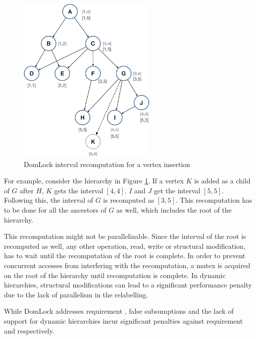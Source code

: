 \begin{figure}[h]
    \centering
    \captionsetup{justification=centering}
    \includegraphics[width=0.6\textwidth]{figures/domlock_example_with_SM.png}
    \caption{DomLock interval recomputation for a vertex insertion}
    \label{fig:domlock_example_SM}
\end{figure}

For example, consider the hierarchy in Figure \ref{fig:domlock_example_SM}. If a vertex $K$ is added as a child of $G$ after $H$, $K$ gets the interval $[4,4]$. $I$ and $J$ get the interval $[5,5]$. Following this, the interval of $G$ is recomputed as $[3,5]$. This recomputation has to be done for all the ancestors of $G$ as well, which includes the root of the hierarchy. 

This recomputation might not be parallelizable. Since the interval of the root is recomputed as well, any other operation, read, write or structural modification, has to wait until the recomputation of the root is complete. 
In order to prevent concurrent accesses from interfering with the recomputation, a mutex is acquired on the root of the hierarchy until recomputation is complete. 
In dynamic hierarchies, structural modifications can lead to a significant performance penalty due to the lack of parallelism in the relabelling. 

While DomLock addresses requirement \Rb, false subsumptions and the lack of support for dynamic hierarchies incur significant penalties against requirement \Rc and \Rd respectively.



